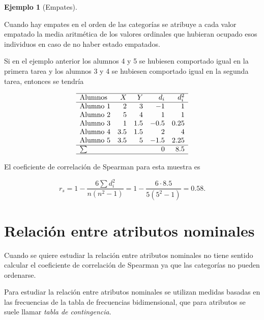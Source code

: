 \documentclass[
  a4paper,
]{scrreport}
\theoremstyle{plain}
\theoremstyle{definition}
\newtheorem{example}{Ejemplo}[chapter]
\theoremstyle{definition}
\theoremstyle{remark}
\begin{document}
\begin{example}[Empates]\protect\hypertarget{exm-coeficiente-correlacion-sperman-empates}{}\label{exm-coeficiente-correlacion-sperman-empates}

Cuando hay empates en el orden de las categorías se atribuye a cada
valor empatado la media aritmética de los valores ordinales que hubieran
ocupado esos individuos en caso de no haber estado empatados.

Si en el ejemplo anterior los alumnos 4 y 5 se hubiesen comportado igual
en la primera tarea y los alumnos 3 y 4 se hubiesen comportado igual en
la segunda tarea, entonces se tendría

\[
\begin{array}{lrrrr}
\hline
\mbox{Alumnos} & X & Y & d_i & d_i^2\\
\hline
\mbox{Alumno 1} & 2 & 3 & -1 & 1\\
\mbox{Alumno 2} & 5 & 4 & 1 & 1 \\
\mbox{Alumno 3} & 1 & 1.5 & -0.5 & 0.25\\
\mbox{Alumno 4} & 3.5 & 1.5 & 2 & 4\\
\mbox{Alumno 5} & 3.5 & 5 & -1.5 & 2.25\\
\hline
\sum &  &  & 0 & 8.5 \\
\hline
\end{array}
\]

El coeficiente de correlación de Spearman para esta muestra es

\[
r_s = 1-\frac{6\sum d_i^2}{n(n^2-1)} = 1- \frac{6\cdot 8.5}{5(5^2-1)} = 0.58.
\]

\end{example}

\section{Relación entre atributos
nominales}\label{relaciuxf3n-entre-atributos-nominales}

Cuando se quiere estudiar la relación entre atributos nominales no tiene
sentido calcular el coeficiente de correlación de Spearman ya que las
categorías no pueden ordenarse.

Para estudiar la relación entre atributos nominales se utilizan medidas
basadas en las frecuencias de la tabla de frecuencias bidimensional, que
para atributos se suele llamar \emph{tabla de contingencia}.
\end{document}
